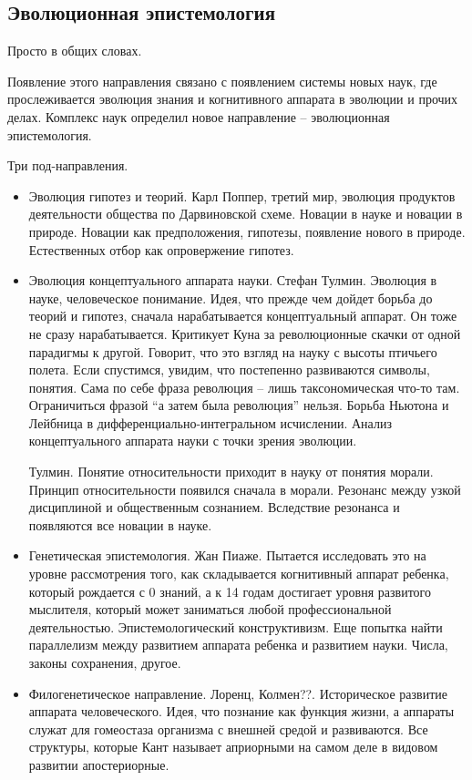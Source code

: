 \documentclass[a4paper, 12pt]{article}
\begin{document}


\subsection{Эволюционная эпистемология}

Просто в общих словах.

Появление этого направления связано с появлением системы новых наук, где 
прослеживается эволюция знания и когнитивного аппарата в эволюции 
и прочих делах. Комплекс наук определил новое направление -- 
эволюционная эпистемология.

Три под-направления.
\begin{itemize}
  \item Эволюция гипотез и теорий.  Карл Поппер, третий мир, эволюция 
    продуктов деятельности общества по Дарвиновской схеме. Новации 
    в науке и новации в природе. Новации как предположения, гипотезы, 
    появление нового в природе. Естественных отбор как опровержение 
    гипотез.

  \item Эволюция концептуального аппарата науки. Стефан Тулмин. Эволюция 
    в науке, человеческое понимание. Идея, что прежде чем дойдет борьба 
    до теорий и гипотез, сначала нарабатывается концептуальный аппарат. 
    Он тоже не сразу нарабатывается. Критикует Куна за революционные 
    скачки от одной парадигмы к другой. Говорит, что это взгляд на науку 
    с высоты птичьего полета. Если спустимся, увидим, что постепенно 
    развиваются символы, понятия. Сама по себе фраза революция -- лишь 
    таксономическая что-то там. Ограничиться фразой ``а затем была 
    революция'' нельзя. Борьба Ньютона и Лейбница 
    в дифференциально-интегральном исчислении. Анализ концептуального 
    аппарата науки с точки зрения эволюции.

    Тулмин. Понятие относительности приходит в науку от понятия морали. 
    Принцип относительности появился сначала в морали. Резонанс между 
    узкой дисциплиной и общественным сознанием. Вследствие резонанса 
    и появляются все новации в науке.

  \item Генетическая эпистемология. Жан Пиаже. Пытается исследовать это 
    на уровне рассмотрения того, как складывается когнитивный аппарат 
    ребенка, который рождается с 0 знаний, а к 14 годам достигает уровня 
    развитого мыслителя, который может заниматься любой профессиональной 
    деятельностью. Эпистемологический конструктивизм. Еще попытка найти 
    параллелизм между развитием аппарата ребенка и развитием науки. 
    Числа, законы сохранения, другое.

  \item Филогенетическое направление. Лоренц, Колмен??. Историческое 
    развитие аппарата человеческого. Идея, что познание как функция 
    жизни, а аппараты служат для гомеостаза организма с внешней средой 
    и развиваются. Все структуры, которые Кант называет априорными на 
    самом деле в видовом развитии апостериорные.
\end{itemize}
\end{document}

